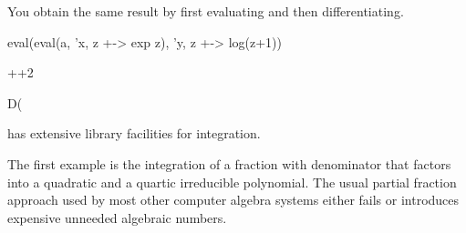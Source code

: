 {{{{{{{{\begin{xtc}
\end{xtc}
\begin{xtc}
\begin{xtccomment}
You obtain the same result by first evaluating  and
then differentiating.
\end{xtccomment}
\begin{spadsrc}
eval(eval(a, 'x, z +-> exp z), 'y, z +-> log(z+1)) 
\end{spadsrc}
\begin{TeXOutput}
\begin{fricasmath}{12}
++2%
\end{fricasmath}
\end{TeXOutput}
\end{xtc}
\begin{xtc}
\begin{xtccomment}
\end{xtccomment}
\begin{spadsrc}
D(%
\end{spadsrc}
\begin{TeXOutput}
\begin{fricasmath}{13}
%
\end{fricasmath}
\end{TeXOutput}
\end{xtc}

%

\Language{} has extensive library facilities for integration.

The first example is the integration of a fraction with
denominator that factors into a quadratic and a quartic
irreducible polynomial.
The usual partial fraction approach used by most other computer
algebra systems either fails or introduces expensive unneeded
algebraic numbers.

}}}}}}}}
